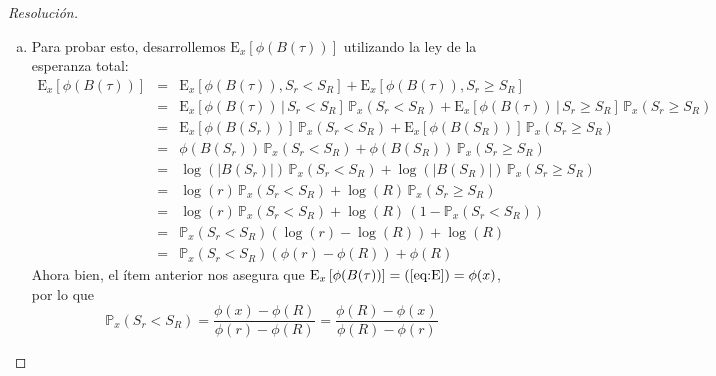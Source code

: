 \documentclass[a4paper,11pt]{article}
\newcommand{\abs}[1]{\ensuremath{\left\lvert #1 \right\rvert}}
\newcommand{\Probx}[2]{\ensuremath{\mathbb{P}_{#1} \left( #2 \right)}}
\newcommand{\Expx}[2]{\ensuremath{\textrm{E}_{#1}\left[#2\right]}}
\newcommand{\ExpxC}[3]{\ensuremath{\textrm{E}_{#1}\left[#2 \, | \, #3\right]}}
\begin{document}
\begin{proof}[Resoluci\'on]
\begin{enumerate}[a.]
    
    \item Para probar esto, desarrollemos $\Expx{x}{\phi(B(\tau))}$ utilizando la ley
    de la esperanza total:
    \begin{eqnarray}
        \Expx{x}{\phi(B(\tau))}
            &=& \Expx{x}{\phi(B(\tau)), S_r < S_R} + 
                \Expx{x}{\phi(B(\tau)), S_r \geq S_R} \nonumber \\
            &=& \ExpxC{x}{\phi(B(\tau))}{S_r < S_R} \, \Probx{x}{S_r < S_R} +
                \ExpxC{x}{\phi(B(\tau))}{S_r \geq S_R} \, \Probx{x}{S_r \geq S_R} \nonumber \\
            &=& \Expx{x}{\phi(B(S_r))}\, \Probx{x}{S_r < S_R} +
                \Expx{x}{\phi(B(S_R))}\, \Probx{x}{S_r \geq S_R} \nonumber \\
            &=& \phi(B(S_r))\, \Probx{x}{S_r < S_R} +
                \phi(B(S_R))\, \Probx{x}{S_r \geq S_R} \nonumber \\
            &=& \log(\abs{B(S_r)})\, \Probx{x}{S_r < S_R} +
                \log(\abs{B(S_R)})\, \Probx{x}{S_r \geq S_R} \nonumber \\
            &=& \log(r)\, \Probx{x}{S_r < S_R} +
                \log(R)\, \Probx{x}{S_r \geq S_R} \nonumber \\
            &=& \log(r)\, \Probx{x}{S_r < S_R} +
                \log(R)\, (1 - \Probx{x}{S_r < S_R}) \nonumber \\
            &=& \Probx{x}{S_r < S_R} (\log(r) - \log(R)) + \log(R) \nonumber \\
            &=& \Probx{x}{S_r < S_R} (\phi(r) - \phi(R)) + \phi(R) \label{eq:E}
    \end{eqnarray}
    Ahora bien, el ítem anterior nos asegura que $\Expx{x}{\phi(B(\tau))} = (\ref{eq:E}) = \phi(x)$,
    por lo que
    $$\Probx{x}{S_r < S_R} = \frac{\phi(x) - \phi(R)}{\phi(r) - \phi(R)} 
        = \frac{\phi(R) - \phi(x)}{\phi(R) - \phi(r)}$$


\end{enumerate}
\end{proof}
\end{document}
